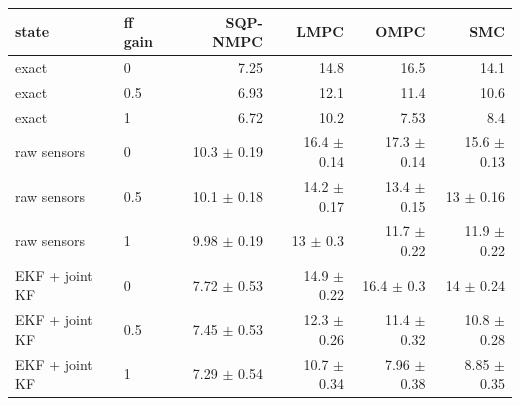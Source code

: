 \begin{tabular}{llrrrr}
\toprule
state & ff gain & SQP-NMPC & LMPC & OMPC & SMC \\
\midrule
exact & 0 & 7.25 & 14.8 & 16.5 & 14.1 \\
exact & 0.5 & 6.93 & 12.1 & 11.4 & 10.6 \\
exact & 1 & 6.72 & 10.2 & 7.53 & 8.4 \\
\addlinespace
raw sensors & 0 & 10.3 $\pm$ 0.19 & 16.4 $\pm$ 0.14 & 17.3 $\pm$ 0.14 & 15.6 $\pm$ 0.13 \\
raw sensors & 0.5 & 10.1 $\pm$ 0.18 & 14.2 $\pm$ 0.17 & 13.4 $\pm$ 0.15 & 13 $\pm$ 0.16 \\
raw sensors & 1 & 9.98 $\pm$ 0.19 & 13 $\pm$ 0.3 & 11.7 $\pm$ 0.22 & 11.9 $\pm$ 0.22 \\
\addlinespace
EKF + joint KF & 0 & 7.72 $\pm$ 0.53 & 14.9 $\pm$ 0.22 & 16.4 $\pm$ 0.3 & 14 $\pm$ 0.24 \\
EKF + joint KF & 0.5 & 7.45 $\pm$ 0.53 & 12.3 $\pm$ 0.26 & 11.4 $\pm$ 0.32 & 10.8 $\pm$ 0.28 \\
EKF + joint KF & 1 & 7.29 $\pm$ 0.54 & 10.7 $\pm$ 0.34 & 7.96 $\pm$ 0.38 & 8.85 $\pm$ 0.35 \\
\bottomrule
\end{tabular}
